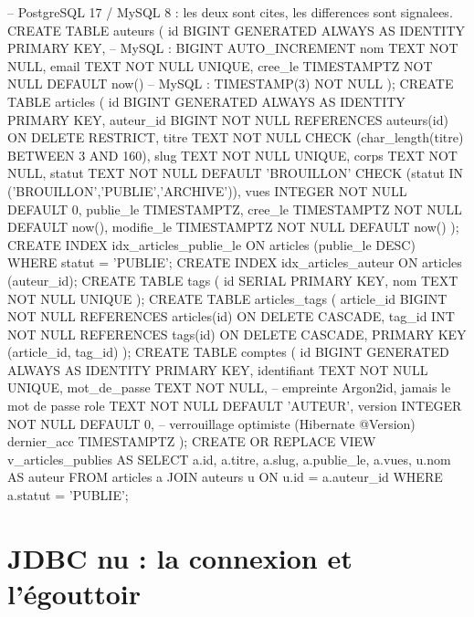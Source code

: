 \begin{codesql}
-- PostgreSQL 17 / MySQL 8 : les deux sont cites, les differences sont signalees.
CREATE TABLE auteurs (
  id         BIGINT GENERATED ALWAYS AS IDENTITY PRIMARY KEY,   -- MySQL : BIGINT AUTO_INCREMENT
  nom        TEXT         NOT NULL,
  email      TEXT         NOT NULL UNIQUE,
  cree_le    TIMESTAMPTZ  NOT NULL DEFAULT now()                 -- MySQL : TIMESTAMP(3) NOT NULL
);
CREATE TABLE articles (
  id         BIGINT GENERATED ALWAYS AS IDENTITY PRIMARY KEY,
  auteur_id  BIGINT       NOT NULL REFERENCES auteurs(id) ON DELETE RESTRICT,
  titre      TEXT         NOT NULL CHECK (char_length(titre) BETWEEN 3 AND 160),
  slug       TEXT         NOT NULL UNIQUE,
  corps      TEXT         NOT NULL,
  statut     TEXT         NOT NULL DEFAULT 'BROUILLON'
             CHECK (statut IN ('BROUILLON','PUBLIE','ARCHIVE')),
  vues       INTEGER      NOT NULL DEFAULT 0,
  publie_le  TIMESTAMPTZ,
  cree_le    TIMESTAMPTZ  NOT NULL DEFAULT now(),
  modifie_le TIMESTAMPTZ  NOT NULL DEFAULT now()
);
CREATE INDEX idx_articles_publie_le ON articles (publie_le DESC) WHERE statut = 'PUBLIE';
CREATE INDEX idx_articles_auteur    ON articles (auteur_id);
CREATE TABLE tags (
  id   SERIAL PRIMARY KEY,
  nom  TEXT NOT NULL UNIQUE
);
CREATE TABLE articles_tags (
  article_id BIGINT NOT NULL REFERENCES articles(id) ON DELETE CASCADE,
  tag_id     INT    NOT NULL REFERENCES tags(id)     ON DELETE CASCADE,
  PRIMARY KEY (article_id, tag_id)
);
CREATE TABLE comptes (
  id            BIGINT GENERATED ALWAYS AS IDENTITY PRIMARY KEY,
  identifiant   TEXT NOT NULL UNIQUE,
  mot_de_passe  TEXT NOT NULL,                       -- empreinte Argon2id, jamais le mot de passe
  role          TEXT NOT NULL DEFAULT 'AUTEUR',
  version       INTEGER NOT NULL DEFAULT 0,          -- verrouillage optimiste (Hibernate @Version)
  dernier_acc   TIMESTAMPTZ
);
CREATE OR REPLACE VIEW v_articles_publies AS
  SELECT a.id, a.titre, a.slug, a.publie_le, a.vues, u.nom AS auteur
  FROM articles a JOIN auteurs u ON u.id = a.auteur_id
  WHERE a.statut = 'PUBLIE';
\end{codesql}

\section{JDBC nu : la connexion et l'\'egouttoir}

